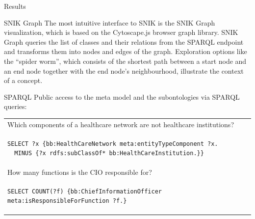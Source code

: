 \documentclass[portrait,final,a0paper,fontscale=0.310]{baposter}
\begin{document}
\begin{poster}
\begin{posterbox}[name=results,column=1]{Results}
\end{posterbox}
\begin{posterbox}[name=snikgraph,column=1,below=results]{SNIK Graph}
\indent
The most intuitive interface to SNIK is the SNIK Graph visualization, which is based on the Cytoscape.js browser graph library.
SNIK Graph queries the list of classes and their relations from the SPARQL endpoint and transforms them into nodes and edges of the graph.
Exploration options like the “spider worm”, which consists of the shortest path between a start node and an end node together with the end node’s neighbourhood, illustrate the context of a concept.
\vspace{0.3em}
  \end{posterbox}
\begin{posterbox}[name=sparql,column=1,below=background]{SPARQL}
\noindent
Public access to the meta model and the subontologies via SPARQL queries:

\vspace{1em}
{
\centering
\begin{tabular*}{\columnwidth}{l}
Which components of a healthcare network are not healthcare institutions?\\
\begin{lstlisting}
SELECT ?x {bb:HealthCareNetwork meta:entityTypeComponent ?x.
  MINUS {?x rdfs:subClassOf* bb:HealthCareInstitution.}}
\end{lstlisting}\\

How many functions is the CIO responsible for?\\
\begin{lstlisting}
SELECT COUNT(?f) {bb:ChiefInformationOfficer meta:isResponsibleForFunction ?f.}
\end{lstlisting}\\


\end{tabular*}}
\end{posterbox}
\end{poster}
\end{document}
